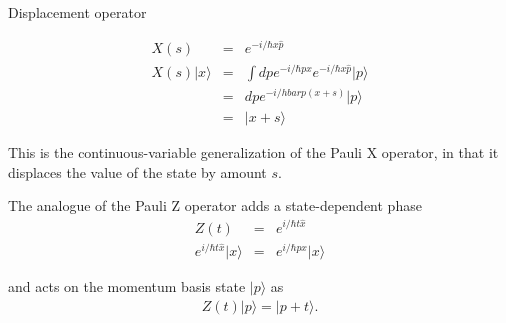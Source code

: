 \documentclass[reprint,
superscriptaddress,
 amsmath,amssymb,
 aps,
prb,
]{revtex4-1}
\newcommand{\ket}[1]{|{#1}\rangle}
\begin{document}
Displacement operator


\begin{eqnarray}
X(s) &=& e^{-i/\hbar x \hat p}\\
X(s)\ket{x} &=&  \int dp e^{-i/\hbar p x} e^{-i/\hbar x \hat p} \ket{p} \\
   			&=& dp e^{-i/hbar p(x+s)} \ket{p} \\
   			&=&\ket{x+s}
\end{eqnarray}

This is the continuous-variable generalization of the Pauli X operator, in that it displaces the value of the state by amount $s$.


The analogue of the Pauli Z operator adds a state-dependent phase
% 
\begin{eqnarray}
Z(t ) &=& e^{i/\hbar t \hat x} \\
 e^{i/\hbar t \hat x} \ket{x} &=& e^{i/\hbar p x} \ket{x}
\end{eqnarray}

\noindent and acts on the momentum basis state $\ket{p}$ as
\begin{eqnarray}
Z(t)\ket{p}=\ket{p+t}.
\end{eqnarray}
\end{document}
